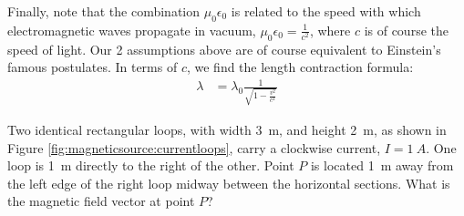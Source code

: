 \begin{solution}
\begin{parts}
Finally, note that the combination $\mu_0\epsilon_0$ is related to the speed with which electromagnetic waves propagate in vacuum, $\mu_0\epsilon_0=\frac{1}{c^2}$, where $c$ is of course the speed of light. Our 2 assumptions above are of course equivalent to Einstein's famous postulates. In terms of $c$, we find the length contraction formula:
\begin{align*}
\lambda&=\lambda_0\frac{1}{\sqrt{1-\frac{v^2}{c^2}}}
\end{align*}

\end{parts}
\end{solution}


\question Two identical rectangular loops, with width \SI{3}{m}, and height \SI{2}{m}, as shown in Figure \ref{fig:magneticsource:currentloops}, carry a clockwise current, $I=\SI{1}{A}$. One loop is \SI{1}{m} directly to the right of the other. Point $P$ is located \SI{1}{m} away from the left edge of the right loop midway between the horizontal sections. What is the magnetic field vector at point $P$?


